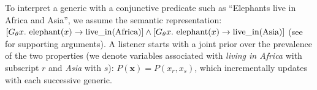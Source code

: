 \documentclass[10pt,letterpaper]{article}
\begin{document}
%
%
To interpret a generic with a conjunctive predicate such as ``Elephants live in Africa and Asia'', we assume the semantic representation:
$
[G_\theta x. \textnormal{ elephant}(x) \to \textnormal{live\_in}(\textnormal{Africa})] \land
[G_\theta x. \textnormal{ elephant}(x) \to \textnormal{live\_in}(\textnormal{Asia})] 
$
(see  for supporting arguments).
A listener starts with a joint prior over the prevalence of the two properties (we denote variables associated with \emph{living in Africa} with subscript $r$ and \emph{Asia} with $s$): $P(\textbf{x}) = P(x_{r}, x_{s})$, which incrementally updates with each successive generic. 
\end{document}
